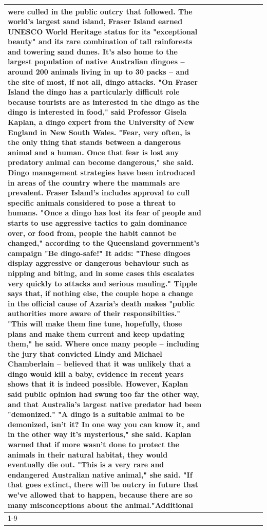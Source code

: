 \begin{table}[H]
\begin{tabular}{lllrlllll}
were culled in the public outcry that followed. The world's largest sand island, Fraser Island earned UNESCO World Heritage status for its "exceptional beauty" and its rare combination of tall rainforests and towering sand dunes. It's also home to the largest population of native Australian dingoes -- around 200 animals living in up to 30 packs -- and the site of most, if not all, dingo attacks. "On Fraser Island the dingo has a particularly difficult role because tourists are as interested in the dingo as the dingo is interested in food," said Professor Gisela Kaplan, a dingo expert from the University of New England in New South Wales. "Fear, very often, is the only thing that stands between a dangerous animal and a human. Once that fear is lost any predatory animal can become dangerous," she said. Dingo management strategies have been introduced in areas of the country where the mammals are prevalent. Fraser Island's includes approval to cull specific animals considered to pose a threat to humans. "Once a dingo has lost its fear of people and starts to use aggressive tactics to gain dominance over, or food from, people the habit cannot be changed," according to the Queensland government's campaign "Be dingo-safe!" It adds: "These dingoes display aggressive or dangerous behaviour such as nipping and biting, and in some cases this escalates very quickly to attacks and serious mauling." Tipple says that, if nothing else, the couple hope a change in the official cause of Azaria's death makes "public authorities more aware of their responsibilties." "This will make them fine tune, hopefully, those plans and make them current and keep updating them," he said. Where once many people -- including the jury that convicted Lindy and Michael Chamberlain -- believed that it was unlikely that a dingo would kill a baby, evidence in recent years shows that it is indeed possible. However, Kaplan said public opinion had swung too far the other way, and that Australia's largest native predator had been "demonized." "A dingo is a suitable animal to be demonized, isn't it? In one way you can know it, and in the other way it's mysterious," she said. Kaplan warned that if more wasn't done to protect the animals in their natural habitat, they would eventually die out. "This is a very rare and endangered Australian native animal," she said. "If that goes extinct, there will be outcry in future that we've allowed that to happen, because there are so many misconceptions about the animal."Additional \\
\cline{1-9}

\end{tabular}
\end{table}
